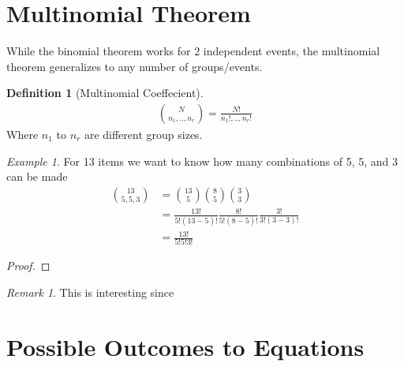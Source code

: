 \documentclass{article}
\theoremstyle{plain}
\theoremstyle{definition}
\newtheorem{definition}{Definition}
\theoremstyle{remark}
\newtheorem{remark}{Remark}
\newtheorem{example}{Example}
\begin{document}

\section{Multinomial Theorem}
While the binomial theorem works for 2 independent events, the multinomial theorem generalizes to any number of groups/events.
\begin{definition}[Multinomial Coeffecient]
  \begin{align*}
    \binom{N}{n_1,..,n_r} = \frac{N!}{n_1!,..,n_r!}
  \end{align*}
  Where $n_1$ to $n_r$ are different group sizes.
\end{definition}

\begin{example}
  For 13 items we want to know how many combinations of 5, 5, and 3 can be made
  \begin{align*}
    \binom{13}{5,5,3} &= \binom{13}{5}\binom{8}{5}\binom{3}{3} \\
                      &= \frac{13!}{5!(13-5)!}\frac{8!}{5!(8-5)!}\frac{3!}{3!(3-3)!} \\
                        &=\frac{13!}{5!5!3!}
  \end{align*}
\end{example}

\begin{proof}
\end{proof}

\begin{remark}
	This is interesting since\textellipsis
\end{remark}

\section{Possible Outcomes to Equations}
\end{document}

